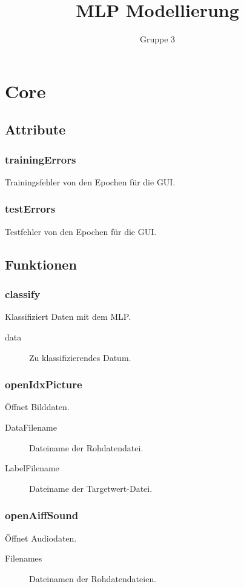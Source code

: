 \documentclass[a4paper,10pt]{scrartcl}
\title{MLP Modellierung}
\author{Gruppe 3}
\begin{document}
\maketitle
\newpage
\tableofcontents
\newpage
\section{Core}

\subsection{Attribute}
\subsubsection{trainingErrors}
Trainingsfehler von den Epochen für die GUI.
\subsubsection{testErrors}
Testfehler von den Epochen für die GUI.


\subsection{Funktionen}
\subsubsection{classify}
Klassifiziert Daten mit dem MLP.
\begin{description}
 \item[data] Zu klassifizierendes Datum.
\end{description}
\subsubsection{openIdxPicture}
Öffnet Bilddaten.
\begin{description}
 \item[DataFilename] Dateiname der Rohdatendatei.
 \item[LabelFilename] Dateiname der Targetwert-Datei.
\end{description}
\subsubsection{openAiffSound}
Öffnet Audiodaten.
\begin{description}
 \item[Filenames] Dateinamen der Rohdatendateien.
\end{description}
\end{document}
